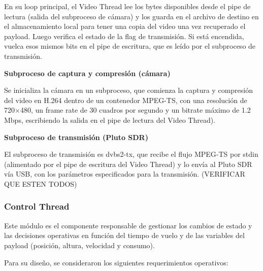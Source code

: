 \documentclass[12pt,a4paper]{article}
\begin{document}
En su loop principal, el Video Thread lee los bytes disponibles desde el pipe de lectura (salida del subproceso de cámara) y los guarda en el archivo de destino en el almacenamiento local para tener una copia del video una vez recuperado el payload. Luego verifica el estado de la flag de transmisión. Si está encendida, vuelca esos mismos bits en el pipe de escritura, que es leído por el subproceso de transmisión.

\textbf{Subproceso de captura y compresión (cámara)}

Se inicializa la cámara en un subproceso, que comienza la captura y compresión del video en H.264 dentro de un contenedor MPEG-TS, con una resolución de 720×480, un frame rate de 30 cuadros por segundo y un bitrate máximo de 1.2 Mbps, escribiendo la salida en el pipe de lectura del Video Thread).

\textbf{Subproceso de transmisión (Pluto SDR)}

El subproceso de transmisión es dvbs2-tx, que recibe el flujo MPEG-TS por stdin (alimentado por el pipe de escritura del Video Thread) y lo envía al Pluto SDR vía USB, con los parámetros especificados para la transmisión. (VERIFICAR QUE ESTEN TODOS)

\subsubsection{Control Thread}\label{control-thread}

Este módulo es el componente responsable de gestionar los cambios de estado y las decisiones operativas en función del tiempo de vuelo y de las variables del payload (posición, altura, velocidad y consumo).

Para su diseño, se consideraron los siguientes requerimientos operativos:
\end{document}
